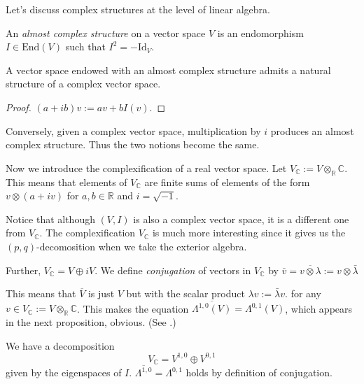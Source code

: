 \documentclass{book}
\begin{document}
\noindent
Let's discuss complex structures at the level
of linear algebra.

\begin{definition}
\label{definition-compl-struc-vecto-space}
An {\it almost complex structure} on a vector
space $V$
is an endomorphism $I \in \text{End}(V)$ such
that $I^2 = -\text{Id}_V$.
\end{definition}

\begin{lemma}
\label{lemma-almos-compl-struc-then-compl}
A vector space endowed with an almost complex
structure
admits a natural structure of a complex
vector space.
\end{lemma}

\begin{proof}
$(a+ib)v:=av + b I(v)$.
\end{proof}

\noindent
Conversely, given a complex vector space,
multiplication by $i$ produces an almost
complex structure.
Thus the two notions become the same.

\medskip\noindent
Now we introduce the complexification of a
real vector space.
Let $V_{\mathbb{C}}:=V
\otimes_{\mathbb{R}}\mathbb{C}$.
This means that elements of $V_{\mathbb{C}}$
are finite sums of elements of the form $v
\otimes (a+iv)$
for $a,b \in \mathbb{R}$ and $i = \sqrt{-1}$.

Notice that although $(V,I)$ is also a
complex vector space,
it is a different one from $V_\mathbb{C}$.
The complexification $V_\mathbb{C}$
is much more interesting since it gives us
the $(p,q)$-decomosition
when we take the exterior algebra.

Further, $V_\mathbb{C}=V \oplus i V$.
We define {\it conjugation} of vectors in
$V_{\mathbb{C}}$ by
$\bar{v}=\overline{v \otimes \lambda} := v
\otimes \bar{\lambda}$

This means that $\overline{V}$ is just $V$
but
with the scalar product $\lambda
v:=\bar{\lambda}v$.
for any $v \in V_{\mathbb{C}}:=V
\otimes_{\mathbb{R}}\mathbb{C}$.
This makes the equation
$\overline{\Lambda^{1,0}(V)}=\Lambda^{0,1}(V)
$,
which appears in the next proposition,
obvious.
(See \cite[p. 25]{huc}.)

\begin{lemma}
\label{lemma-i-eigenspace-decomposition}
We have a decomposition
$$
V_\mathbb{C}=V^{1,0}\oplus V^{0,1}
$$
given by the eigenspaces of $I$.
$\overline{\Lambda^{1,0}}=\Lambda^{0,1}$
holds by definition of conjugation.
\end{lemma}
\end{document}
